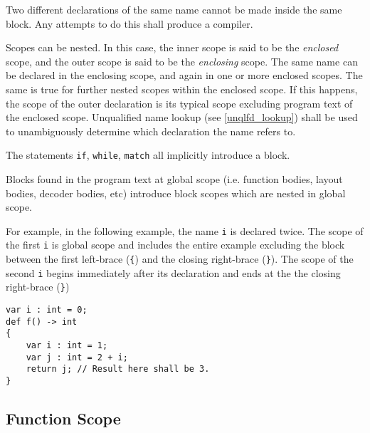 Two different declarations of the same name cannot be made inside the same block. Any attempts to do this shall produce a compiler.

Scopes can be nested. In this case, the inner scope is said to be the \textit{enclosed} scope, and the outer scope is said to be the \textit{enclosing} scope. The same name can be declared in the enclosing scope, and again in one or more enclosed scopes. The same is true for further nested scopes within the enclosed scope. If this happens, the scope of the outer declaration is its typical scope excluding program text of the enclosed scope. Unqualified name lookup (see \ref{unqlfd_lookup}) shall be used to unambiguously determine which declaration the name refers to.

The statements \texttt{if}, \texttt{while}, \texttt{match} all implicitly introduce a block.


Blocks found in the program text at global scope (i.e. function bodies, layout bodies, decoder bodies, etc) introduce block scopes which are nested in global scope.

For example, in the following example, the name \texttt{i} is declared twice. The scope of the first \texttt{i} is global scope and includes the entire example excluding the block between the first left-brace (\texttt{\{}) and the closing right-brace (\texttt{\}}). The scope of the second \texttt{i} begins immediately after its declaration and ends at the the closing right-brace (\texttt{\}})

\begin{minip}
\begin{lstlisting}
var i : int = 0;
def f() -> int
{
	var i : int = 1;
	var j : int = 2 + i;
	return j; // Result here shall be 3.
}
\end{lstlisting}
\end{minip}

\subsection{Function Scope} \label{function_scope}

